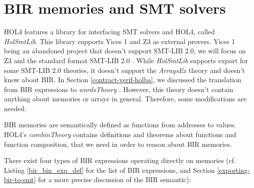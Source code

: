 \documentclass{kththesis}
\begin{document}
{

\section{BIR memories and SMT solvers} \label{bir-memories-with-smt-solvers}


HOL4 features a library for interfacing \gls{SMT} solvers and HOL4, called \textit{HolSmtLib}. This library supports Yices 1 and Z3 as external provers. Yices 1 being an abandoned project that doesn't support SMT-LIB 2.0, we will focus on Z3 and the standard format SMT-LIB 2.0 \cite{barrett_satisfiability_2016}. While \textit{HolSmtLib} supports export for some SMT-LIB 2.0 theories, it doesn't support the \textit{ArraysEx} theory and doesn't know about BIR. In Section \ref{contract-verif-holba}, we discussed the translation from BIR expressions to \textit{wordsTheory} \footnotemark. However, this theory doesn't contain anything about memories or arrays in general. Therefore, some modifications are needed.


BIR memories are semantically defined as functions from addresses to values. HOL4's \textit{combinTheory} contains definitions and theorems about functions and function composition, that we need in order to reason about BIR memories.

There exist four types of BIR expressions operating directly on memories (cf. Listing \ref{bir_bin_exp_def} for the list of BIR expressions, and Section \ref{exporting-bir-to-smt} for a more precise discussion of the BIR semantic):

}
\end{document}
